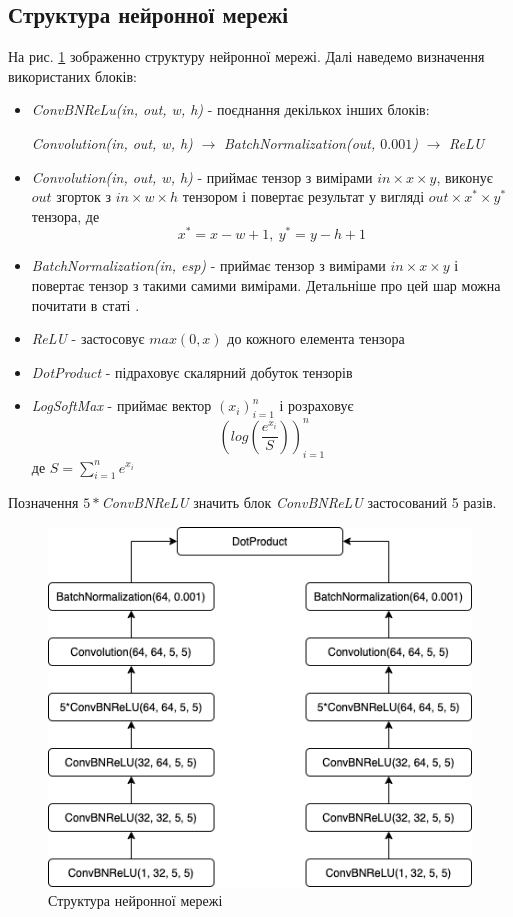 \documentclass{article}
\theoremstyle{definition}
\begin{document}
\subsection{Структура нейронної мережі}
На рис. \ref{fig:nn_structure} зображенно структуру нейронної мережі. Далі наведемо визначення використаних блоків:
\begin{itemize}
	\item \textit{ConvBNReLu(in, out, w, h)} - поєднання декількох інших блоків: 
	
	\textit{Convolution(in, out, w, h)} $\to$ \textit{BatchNormalization(out, $0.001$)} $\to$ \textit{ReLU}
	
	\item \textit{Convolution(in, out, w, h)} - приймає тензор з вимірами $in \times x \times y$, виконує $out$ згорток з $in \times w \times h$ тензором і повертає результат у вигляді $out \times x^* \times y^*$ тензора, де 
	\[ x^* = x - w + 1, \  y^* = y - h + 1 \]
	
	\item \textit{BatchNormalization(in, esp)} - приймає тензор з вимірами $in \times x \times y$ і повертає тензор з такими самими вимірами. Детальніше про цей шар можна почитати в статі \cite{ioffe2015batch}.
	
	\item \textit{ReLU} - застосовує $max(0, x)$ до кожного елемента тензора
	
	\item \textit{DotProduct} - підраховує скалярний добуток тензорів
	
	\item \textit{LogSoftMax} - приймає вектор $(x_i)_{i=1}^n$ і розраховує 
	\[ \left( log\left( \frac{e^{x_i}}{S} \right) \right)_{i=1}^n \]
	де $S = \sum_{i=1}^n e^{x_i}$
\end{itemize}

Позначення $5*$\textit{ConvBNReLU} значить блок \textit{ConvBNReLU} застосований 5 разів.
	
\begin{figure}[h]
	\includegraphics[width=\linewidth]{nn_structure_prod}
	\centering
	\caption{Структура нейронної мережі}
	\label{fig:nn_structure}
\end{figure}
\end{document}
